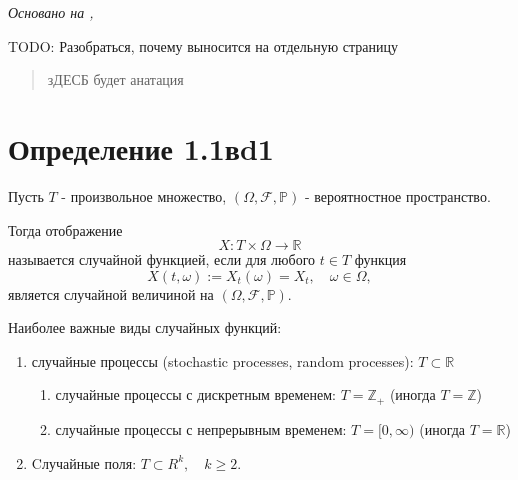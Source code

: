 \textit{Основано на \cite{adeshereKorrelyaciyaMezhduVremennymi2021},
\cite{panovTeoriyaSluchaynyhProcessov2018}}

TODO: Разобраться, почему выносится на отдельную страницу

\begin{abstract}
  зДЕСБ будет анатация
\end{abstract}

\section*{Определение 1.1вd1}

Пусть \( T \) - произвольное множество, \( (\Omega, \mathcal{F},
\mathbb{P}) \) - вероятностное пространство.

Тогда отображение \[ X : T \times \Omega \to \mathbb{R} \] называется
случайной функцией, если для
любого \( t \in T \) функция \[ X(t, \omega) := X_t(\omega) = X_t,
\quad \omega \in \Omega, \]  является случайной величиной на \(
(\Omega, \mathcal{F}, \mathbb{P}) \).

Наиболее важные виды случайных функций:
\begin{enumerate}
  \item случайные процессы (stochastic processes, random processes):
    \( T \subset \mathbb{R} \)
    \begin{enumerate}
      \item случайные процессы с дискретным временем: \( T =
        \mathbb{Z}_+ \) (иногда \( T = \mathbb{Z} \))
      \item случайные процессы с непрерывным временем: \( T = [0,
        \infty) \) (иногда \( T = \mathbb{R} \))
    \end{enumerate}
  \item Cлучайные поля: \( T \subset R^k, \quad k \geq 2 \).
\end{enumerate}



